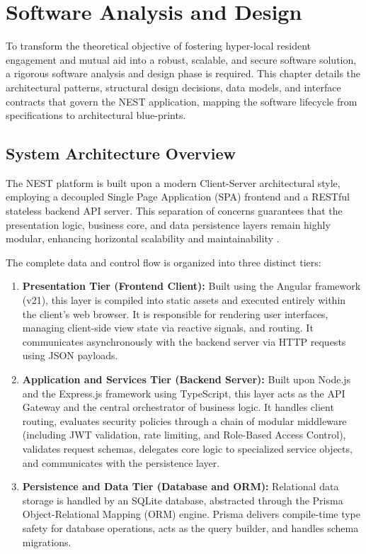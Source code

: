 \chapter{Software Analysis and Design}
\label{chap:app-design-architecture}

To transform the theoretical objective of fostering hyper-local resident engagement and mutual aid into a robust, scalable, and secure software solution, a rigorous software analysis and design phase is required. This chapter details the architectural patterns, structural design decisions, data models, and interface contracts that govern the NEST application, mapping the software lifecycle from specifications to architectural blue-prints.

\section{System Architecture Overview}
The NEST platform is built upon a modern Client-Server architectural style, employing a decoupled Single Page Application (SPA) frontend and a RESTful stateless backend API server. This separation of concerns guarantees that the presentation logic, business core, and data persistence layers remain highly modular, enhancing horizontal scalability and maintainability \cite{fowler2002patterns}.

The complete data and control flow is organized into three distinct tiers:
\begin{enumerate}
    \item \textbf{Presentation Tier (Frontend Client):} Built using the Angular framework (v21), this layer is compiled into static assets and executed entirely within the client's web browser. It is responsible for rendering user interfaces, managing client-side view state via reactive signals, and routing. It communicates asynchronously with the backend server via HTTP requests using JSON payloads.
    \item \textbf{Application and Services Tier (Backend Server):} Built upon Node.js and the Express.js framework using TypeScript, this layer acts as the API Gateway and the central orchestrator of business logic. It handles client routing, evaluates security policies through a chain of modular middleware (including JWT validation, rate limiting, and Role-Based Access Control), validates request schemas, delegates core logic to specialized service objects, and communicates with the persistence layer.
    \item \textbf{Persistence and Data Tier (Database and ORM):} Relational data storage is handled by an SQLite database, abstracted through the Prisma Object-Relational Mapping (ORM) engine. Prisma delivers compile-time type safety for database operations, acts as the query builder, and handles schema migrations.
\end{enumerate}


